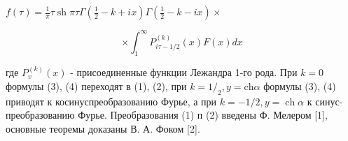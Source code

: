 \documentclass[10pt]{article}
\begin{document}
$f(\tau)=\frac{1}{\pi} \tau \operatorname{sh} \pi \tau \Gamma\left(\frac{1}{2}-k+i x\right) \Gamma\left(\frac{1}{2}-k-i x\right) \times$



\[

\times \int_{1}^{\infty} P_{i \tau-1 / 2}^{(k)}(x) F(x) d x

\]



где $P_{v}^{(k)}(x)$ - присоединенные функции Лежандра 1-го рода. При $k=0$ формулы (3), (4) переходят в (1), (2), при $k=1 /_{2}, y=\mathrm{ch} \alpha$ формулы (3), (4) приводят к косинуспреобразованию Фурье, а при $k=-1 / 2, y=\operatorname{ch} \alpha$ к синус-преобразованию Фурье. Преобразования (1) п (2) введены Ф. Мелером [1], основные теоремы доказаны В. А. Фоком [2].
\end{document}
